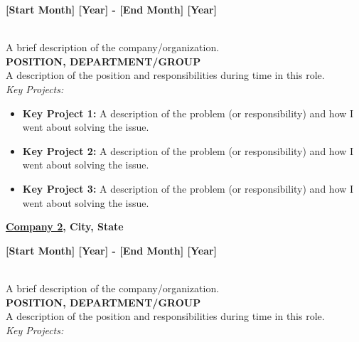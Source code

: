 \documentclass[letterpaper, 10pt]{article}
\begin{document}
\begin{minipage}{0.50\linewidth}
	\begin{flushright}
	\textbf{[Start Month] [Year] - [End Month] [Year]}
	 \end{flushright}
\end{minipage} \\[0.10cm]
\noindent A brief description of the company/organization. \\[0.10cm]
\noindent\textbf{\MakeUppercase{position, department/group}} \\[0.10cm]
A description of the position and responsibilities during time in this role. \\[0.05cm]
\textit{Key Projects:}
\vspace*{-0.15cm}
\begin{itemize}
	\setlength\itemsep{0.05 em}
	\item \textbf{Key Project 1:} A description of the problem (or responsibility) and how I went about solving the issue.
	\item \textbf{Key Project 2:} A description of the problem (or responsibility) and how I went about solving the issue.
	\item \textbf{Key Project 3:} A description of the problem (or responsibility) and how I went about solving the issue.
\end{itemize}
\begin{minipage}[t]{0.45\textwidth}
	\textbf{\underline{Company 2}, City, State}
\end{minipage}
\begin{minipage}{0.50\linewidth}
	\begin{flushright}
	\textbf{[Start Month] [Year] - [End Month] [Year]}
	 \end{flushright}
\end{minipage} \\[0.10cm]
\noindent A brief description of the company/organization. \\[0.10cm]
\noindent\textbf{\MakeUppercase{position, department/group}} \\[0.10cm]
A description of the position and responsibilities during time in this role. \\[0.05cm]
\textit{Key Projects:}
\vspace*{-0.15cm}
\end{document}
